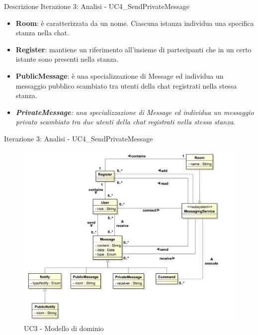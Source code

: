 \begin{frame} [allowframebreaks] {Descrizione Iterazione 3: Analisi - UC4\_SendPrivateMessage}
\begin{itemize}
          MessagingService (es. /join '\#Medical' richiesta da parte dell'utente a registrarsi alla stanza Medical).        
   \item \textbf{Room}: è caratterizzata da un nome. Ciascuna istanza individua una specifica stanza nella chat.
   \item \textbf{Register}: mantiene un riferimento all’insieme di partecipanti che in un certo istante sono presenti nella stanza.
   \item \textbf{PublicMessage}: è una specializzazione di Message ed individua un messaggio pubblico scambiato tra utenti della chat registrati nella 
         stessa stanza. 
   \item \textit{\textbf{PrivateMessage}: una specializzazione di Message ed individua un messaggio privato scambiato tra due utenti della chat registrati nella  
         stessa stanza}. 
  \end{itemize}
\end{frame}

\begin{frame} {Iterazione 3: Analisi - UC4\_SendPrivateMessage}
   \begin{figure}
     \includegraphics[scale=0.16]{image_astah/Iteration_3_DomainModel/UC4_SendPrivateMessage_DM.png}{\centering}
     \caption{UC3 - Modello di dominio}
     \label{fig_UC4_SPM_DM} 
   \end{figure}
\end{frame}

